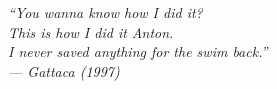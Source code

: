 \cleardoublepage
\thispagestyle{empty}

\vspace*{\fill}

\begin{flushright}
\itshape
``You wanna know how I did it? \\
This is how I did it Anton. \\
I never saved anything for the swim back.''\\[1em]
--- Gattaca (1997)
\end{flushright}

\vspace*{\fill}
